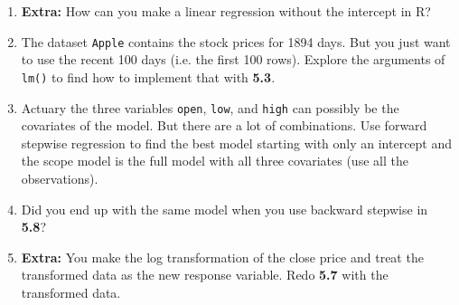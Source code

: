 \documentclass[a4paper]{article}
\begin{document}
\begin{enumerate}
 \item \textbf{Extra:} How can you make a linear regression without the
   intercept in R?

 \item The dataset \texttt{Apple} contains the stock prices for 1894 days. But
   you just want to use the recent 100 days (i.e. the first 100 rows). Explore
   the arguments of \texttt{lm()} to find how to implement that with \textbf{5.3}. 

 \item Actuary the three variables \texttt{open}, \texttt{low}, and
   \texttt{high} can possibly be the covariates of the model. But there are a
   lot of combinations. Use forward stepwise regression to find the best model
   starting with only an intercept and the scope model is the full model with
   all three covariates (use all the observations). 

 \item Did you end up with the same model when you use backward stepwise in
   \textbf{5.8}?

 \item \textbf{Extra:} You make the log transformation of the close price and treat the
   transformed data as the new response variable. Redo \textbf{5.7} with the
   transformed data.

\end{enumerate}
\end{document}
